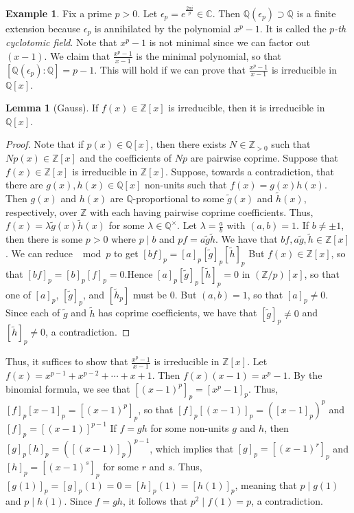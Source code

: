 \documentclass[10pt,letterpaper,cm]{nupset}
\theoremstyle{definition}
\newtheorem{exmp}[definition]{Example}
\theoremstyle{theorem}
\newtheorem{lemma}[definition]{Lemma}
\theoremstyle{remark}
\newcommand{\C}{\mathbb C}
\newcommand{\Q}{\mathbb Q}
\newcommand{\Z}{\mathbb Z}
\newcommand{\1}{\mathbf{1}}
\newcommand{\0}{\vec 0}
\begin{document}
\begin{exmp} 
 Fix a prime $p>0$. Let $\epsilon_p = e^{\frac{2\pi i}{p}} \in \C$. Then $\Q(\epsilon_p) \supset \Q$ is a finite extension because $\epsilon_p$ is annihilated by the polynomial $x^p-1$. It is called the \textit{$p$-th cyclotomic field}. Note that $x^p-1$ is not minimal since we can factor out $(x-1)$. We claim that $\frac{x^p-1}{x-1}$ is the minimal polynomial, so that $[\Q(\epsilon_p) : \Q] =p-1$. This will hold if we can prove that $\frac{x^p-1}{x-1}$ is irreducible in $\Q[x]$. 
\begin{lemma}[Gauss]
If $f(x) \in \Z[x]$ is irreducible, then it is irreducible in $\Q[x]$.
\end{lemma}
\begin{proof}
Note that if $p(x) \in \Q[x]$, then there exists $N \in \Z_{>0}$ such that $N p(x) \in \Z[x]$ and the coefficients  of $Np$ are pairwise coprime. Suppose that $f(x) \in \Z[x]$ is irreducible in $\Z[x]$. Suppose, towards a contradiction, that  there are $g(x), h(x)\in \Q[x]$ non-units such that $f(x) = g(x)h(x)$. Then $g(x)$ and $h(x)$ are $\Q$-proportional to some $\tilde{g}(x)$ and $\tilde{h}(x)$, respectively, over $\Z$ with each having pairwise coprime coefficients. Thus, $f(x) = \lambda \tilde{g}(x)\tilde{h}(x)$ for some $\lambda \in \Q^{\times}$. Let $\lambda = \frac{a}{b}$ with $(a,b)=1$. If $b \ne \pm 1$, then there is some $p>0$ where $p \mid b$ and $pf = a \tilde{g}\tilde{h}$. We have that $bf, a \tilde{g}, \tilde{h} \in \Z[x]$. We can reduce $\mod p$ to get $[bf]_p = [a]_p[\tilde{g}]_p[\tilde{h}]_p$ But $f(x) \in \Z[x]$, so that $[bf]_p  = [b]_p[f]_p =0$.Hence $[a]_p[\tilde{g}]_p[\tilde{h}]_p =0$ in $(\Z/p)[x]$, so that one of $[a]_p$, $[\tilde{g}]_p$, and $[\tilde{h}_p]$ must be $0$. But $(a,b) =1$, so that $[a]_p \ne 0$. Since each of $\tilde{g}$ and $\tilde{h}$ has coprime coefficients, we have that $[\tilde{g}]_p \ne 0$ and $[\tilde{h}]_p \ne 0$, a contradiction. 
\end{proof}
Thus, it suffices to show that $\frac{x^p-1}{x-1}$  is irreducible in $\Z[x]$. Let $f(x) = x^{p-1} + x^{p-2} + \cdots + x + 1$. Then $f(x) (x-1) = x^p-1$. By the binomial formula, we see that $[(x-1)^p]_p = [x^p-1]_p$. Thus, $[f]_p[x-1]_p = [(x-1)^p]_p$, so that $[f]_p[(x-1)]_p = ([x-1]_p)^p$ and $[f]_p = [(x-1)]^{p-1}$ If $f=gh$ for some non-units $g$ and $h$, then $[g]_p[h]_p = ([(x-1)]_p)^{p-1}$, which implies that $[g]_p = [(x-1)^r]_p$ and $[h]_p = [(x-1)^s]_p$ for some $r$ and $s$. Thus, $[g(1)]_p = [g]_p(1) = 0 = [h]_p(1)= [h(1)]_p$, meaning that $p\mid g(1)$ and $p\mid h(1)$. Since $f=gh$, it follows that $p^2 \mid f(1) =p$, a contradiction.
\end{exmp}
\end{document}
